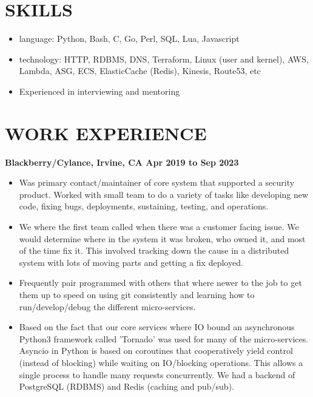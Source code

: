 \documentclass{res}
\begin{document}

\address{john@jjdev.com - (657) 400 9422 - Westminster, CA 92683}

\begin{resume}
  \section{SKILLS}

  \begin{itemize}

  \item
    language: Python, Bash, C, Go, Perl, SQL, Lua, Javascript
  \item
      technology: HTTP, RDBMS, DNS, Terraform, Linux (user and
      kernel), AWS, Lambda, ASG, ECS, ElasticCache (Redis), Kinesis,
      Route53, etc
  \item
      Experienced in interviewing and mentoring
  \end{itemize}

  \section{WORK EXPERIENCE}

  {\large \bf Blackberry/Cylance, Irvine, CA \hfill Apr 2019 to Sep 2023}
  \begin{itemize}
  \item
    Was primary contact/maintainer of core system that supported a
    security product.  Worked with small team to do a variety of tasks
    like developing new code, fixing bugs, deployments, sustaining,
    testing, and operations.

  \item
    We where the first team called when there was a customer facing
    issue. We would determine where in the system it was broken, who
    owned it, and most of the time fix it.  This involved tracking down
    the cause in a distributed system with lots of moving parts and
    getting a fix deployed.

  \item
    Frequently pair programmed with others that where newer to the job
    to get them up to speed on using git consistently and learning how
    to run/develop/debug the different micro-services.

  \item
Based on the fact that our core services where IO bound
an asynchronous Python3 framework called 'Tornado' was used for many
of the micro-services. Asyncio in Python is based on coroutines that
cooperatively yield control (instead of blocking) while waiting on
IO/blocking operations. This allows a single process to handle many
requests concurrently.  We had a backend of PostgreSQL (RDBMS) and Redis
(caching and pub/sub).


\end{itemize}
\end{resume}
\end{document}
